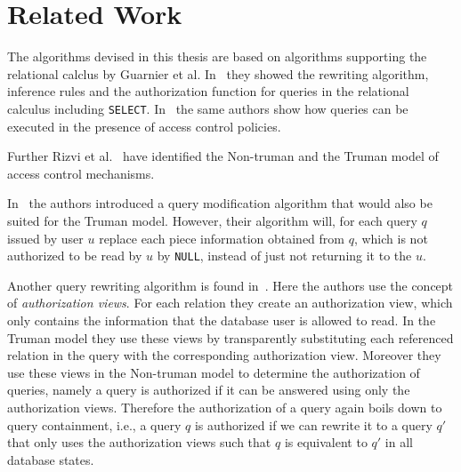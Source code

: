 \section{Related Work}

The algorithms devised in this thesis are based on algorithms supporting the relational calclus by Guarnier et al. In~\cite{guarnieri2016strong} they showed the rewriting algorithm, inference rules and the authorization function for queries in the relational calculus including \texttt{SELECT}.
%
In~\cite{guarnieri2014optimal} the same authors show how queries can be executed in the presence of access control policies.

Further Rizvi et al.~\cite{rizvi2004extending} have identified the Non-truman and the Truman model of access control mechanisms.

In~\cite{wang2007correctness} the authors introduced a query modification algorithm that would also be suited for the Truman model.
%
However, their algorithm will, for each query $q$ issued by user $u$ replace each piece information obtained from $q$, which is not authorized to be read by $u$ by \texttt{NULL}, instead of just not returning it to the $u$.

Another query rewriting algorithm is found in~\cite{rizvi2004extending}. 
%
Here the authors use the concept of \emph{authorization views}.
%
For each relation they create an authorization view, which only contains the information that the database user is allowed to read.
%
In the Truman model they use these views by transparently substituting each referenced relation in the query with the corresponding authorization view.
%
Moreover they use these views in the Non-truman model to determine the authorization of queries, namely a query is authorized if it can be answered using only the authorization views.
%
Therefore the authorization of a query again boils down to query containment, i.e., a query $q$ is authorized if we can rewrite it to a query $q'$ that only uses the authorization views such that $q$ is equivalent to $q'$ in all database states.